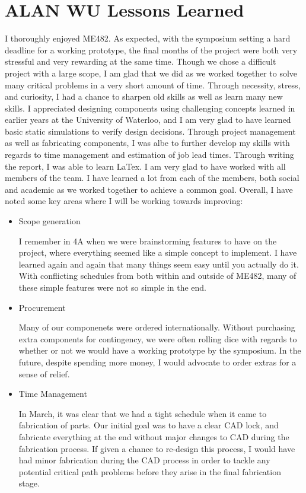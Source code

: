 \documentclass[11pt]{article}
\begin{document}
\section{ALAN WU Lessons Learned}
I thoroughly enjoyed ME482. As expected, with the symposium setting a hard deadline for a working prototype, the final months of the project were both very stressful and very rewarding at the same time. Though we chose a difficult project with a large scope, I am glad that we did as we worked together to solve many critical problems in a very short amount of time. Through necessity, stress, and curiosity, I had a chance to sharpen old skills as well as learn many new skills. 
I appreciated designing components using challenging concepts learned in earlier years at the University of Waterloo, and I am very glad to have learned basic static simulations to verify design decisions. Through project management as well as fabricating components, I was albe to further develop my skills with regards to time management and estimation of job lead times. Through writing the report, I was able to learn LaTex. 
I am very glad to have worked with all members of the team. I have learned a lot from each of the members, both social and academic as we worked together to achieve a common goal. 
Overall, I have noted some key areas where I will be working towards improving: 
\begin{itemize}
\item Scope generation
	\begin{addmargin}[1em]{1em}
	I remember in 4A when we were brainstorming features to have on the project, where everything seemed like a simple concept to implement. I have learned again and again that many things seem easy until you actually do it. With conflicting schedules from both within and outside of ME482, many of these simple features were not so simple in the end.
	\end{addmargin}
\item Procurement
	\begin{addmargin}[1em]{1em}
	Many of our componenets were ordered internationally. Without purchasing extra components for contingency, we were often rolling dice with regards to whether or not we would have a working prototype by the symposium. In the future, despite spending more money, I would advocate to order extras for a sense of relief.
	\end{addmargin}
\item Time Management
	\begin{addmargin}[1em]{1em}
	In March, it was clear that we had a tight schedule when it came to fabrication of parts. Our initial goal was to have a clear CAD lock, and fabricate everything at the end without major changes to CAD during the fabrication process. If given a chance to re-design this process, I would have had minor fabrication during the CAD process in order to tackle any potential critical path problems before they arise in the final fabrication stage. 
	\end{addmargin}
\end{itemize}
\end{document}
